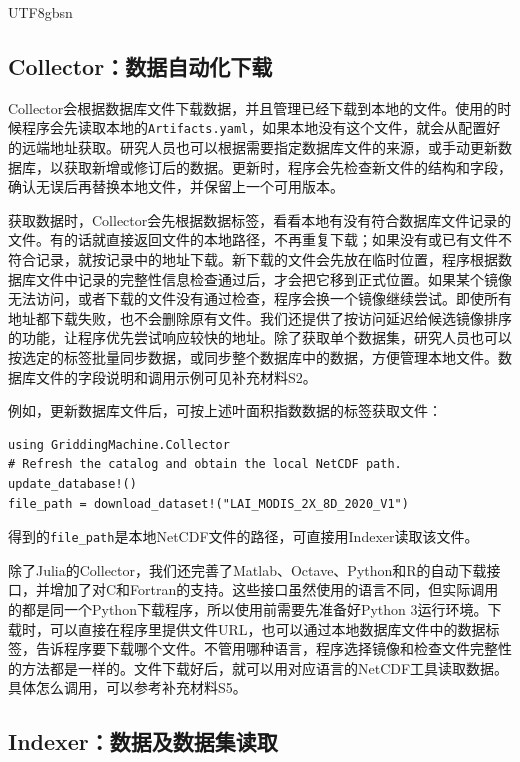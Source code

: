 \documentclass[numdoi]{chinese}
\begin{document}
\begin{CJK}{UTF8}{gbsn}
\subsection{Collector：数据自动化下载}

Collector会根据数据库文件下载数据，并且管理已经下载到本地的文件。使用的时候程序会先读取本地的\nolinkurl{Artifacts.yaml}，如果本地没有这个文件，就会从配置好的远端地址获取。研究人员也可以根据需要指定数据库文件的来源，或手动更新数据库，以获取新增或修订后的数据。更新时，程序会先检查新文件的结构和字段，确认无误后再替换本地文件，并保留上一个可用版本。

获取数据时，Collector会先根据数据标签，看看本地有没有符合数据库文件记录的文件。有的话就直接返回文件的本地路径，不再重复下载；如果没有或已有文件不符合记录，就按记录中的地址下载。新下载的文件会先放在临时位置，程序根据数据库文件中记录的完整性信息检查通过后，才会把它移到正式位置。如果某个镜像无法访问，或者下载的文件没有通过检查，程序会换一个镜像继续尝试。即使所有地址都下载失败，也不会删除原有文件。我们还提供了按访问延迟给候选镜像排序的功能，让程序优先尝试响应较快的地址。除了获取单个数据集，研究人员也可以按选定的标签批量同步数据，或同步整个数据库中的数据，方便管理本地文件。数据库文件的字段说明和调用示例可见补充材料S2。

例如，更新数据库文件后，可按上述叶面积指数数据的标签获取文件：

\begingroup\singlespacing
\begin{Verbatim}[fontsize=\small,frame=single,framesep=5pt]
using GriddingMachine.Collector
# Refresh the catalog and obtain the local NetCDF path.
update_database!()
file_path = download_dataset!("LAI_MODIS_2X_8D_2020_V1")
\end{Verbatim}
\endgroup

得到的\nolinkurl{file_path}是本地NetCDF文件的路径，可直接用Indexer读取该文件。

除了Julia的Collector，我们还完善了Matlab、\allowbreak{}Octave、\allowbreak{}Python和R的自动下载接口，并增加了对C和Fortran的支持。这些接口虽然使用的语言不同，但实际调用的都是同一个Python下载程序，所以使用前需要先准备好Python 3运行环境。下载时，可以直接在程序里提供文件URL，也可以通过本地数据库文件中的数据标签，告诉程序要下载哪个文件。不管用哪种语言，程序选择镜像和检查文件完整性的方法都是一样的。文件下载好后，就可以用对应语言的NetCDF工具读取数据。具体怎么调用，可以参考补充材料S5。

\subsection{Indexer：数据及数据集读取}


\end{CJK}
\end{document}
